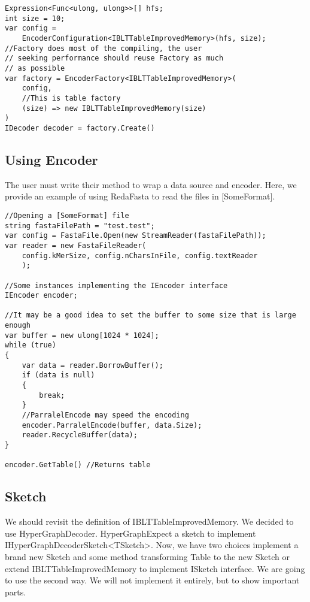 \begin{lstlisting}
Expression<Func<ulong, ulong>>[] hfs;
int size = 10;
var config = 
    EncoderConfiguration<IBLTTableImprovedMemory>(hfs, size);
//Factory does most of the compiling, the user
// seeking performance should reuse Factory as much
// as possible
var factory = EncoderFactory<IBLTTableImprovedMemory>(
    config, 
    //This is table factory
    (size) => new IBLTTableImprovedMemory(size)
)
IDecoder decoder = factory.Create()
\end{lstlisting}

\subsection{Using Encoder}
The user must write their method to wrap a data source and encoder. Here, we provide an example of using RedaFasta to read the files in [SomeFormat]. 
\begin{lstlisting}
//Opening a [SomeFormat] file
string fastaFilePath = "test.test";
var config = FastaFile.Open(new StreamReader(fastaFilePath));
var reader = new FastaFileReader(
    config.kMerSize, config.nCharsInFile, config.textReader
    );

//Some instances implementing the IEncoder interface
IEncoder encoder;

//It may be a good idea to set the buffer to some size that is large enough
var buffer = new ulong[1024 * 1024];
while (true)
{
    var data = reader.BorrowBuffer();
    if (data is null)
    {
        break;
    }
    //ParralelEncode may speed the encoding
    encoder.ParralelEncode(buffer, data.Size);
    reader.RecycleBuffer(data);
}

encoder.GetTable() //Returns table
\end{lstlisting}

\subsection{Sketch}
We should revisit the definition of IBLTTableImprovedMemory. We decided to use HyperGraphDecoder. HyperGraphExpect a sketch to implement IHyperGraphDecoderSketch<TSketch>. Now, we have two choices implement a brand new Sketch and some method transforming Table to the new Sketch or extend IBLTTableImprovedMemory to implement ISketch interface. We are going to use the second way. We will not implement it entirely, but to show important parts. 


